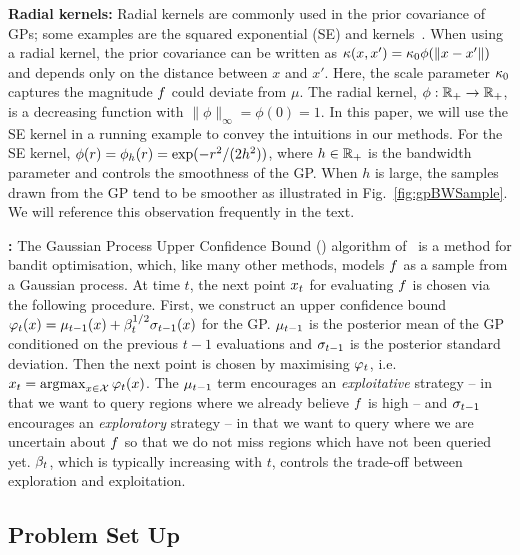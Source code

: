 \textbf{Radial kernels:}
Radial kernels are commonly used in the prior covariance of GPs;
some examples are the squared exponential (SE) and \matern{} kernels~\citep{rasmussen06gps}.
When using a radial kernel,
the prior covariance can be written as $\kappa(x,x') = \kappa_0\phi(\|x-x'\|)$ and
depends only on the distance between $x$ and $x'$.
Here, the scale parameter $\kappa_0$ 
captures the magnitude $f$ could deviate from $\mu$.
The radial kernel, $\phi:\mathbb{R}_{+}\rightarrow\mathbb{R}_+$, is a decreasing function with
$\|\phi\|_\infty = \phi(0) = 1$.
In this paper, we will use the SE kernel in a running example to convey the
intuitions in our methods. 
For the SE kernel, $\phi(r) = \phi_{h}(r) = \exp(-r^2/(2h^2))$, where $h\in\mathbb{R}_+$ is
the bandwidth parameter and controls the smoothness of the GP.
When $h$ is large, the samples drawn from the GP tend to
be smoother as illustrated in Fig.~\ref{fig:gpBWSample}.
We will reference this observation frequently in the text.

\insertFigBWSample

\textbf{\gpucb:}
The Gaussian Process Upper Confidence Bound (\gpucb) algorithm
of~\citet{srinivas10gpbandits}  is a method for bandit optimisation,
which, like many other \bayos methods, models $f$ as a sample from a Gaussian process.
At time $t$, the next point $x_t$ for evaluating $f$ is chosen via the following
procedure.
First, we construct an upper confidence bound
$\varphi_t(x) = \mu_{t-1}(x) + \beta^{1/2}_t \sigma_{t-1}(x)$ for the GP. 
$\mu_{t-1}$ is the posterior mean of the GP conditioned on the previous $t-1$ evaluations
and $\sigma_{t-1}$ is the posterior standard deviation.
Then the next point is chosen by maximising $\varphi_t$, i.e.
$x_t=\mathop{\mathrm{argmax}}_{x\in\mathcal{X}}\varphi_t(x)$.
The $\mu_{t-1}$ term encourages an \emph{exploitative} strategy -- in that we want to query
regions where we already believe  $f$ is high -- and $\sigma_{t-1}$ encourages
an \emph{exploratory} strategy -- in that we want to query where we are uncertain
about $f$ so that we do not miss regions which have not been queried yet.
$\beta_t$, which is typically increasing with $t$, controls the trade-off between
exploration and exploitation.


\subsection{Problem Set Up}
\label{sec:prelims}

